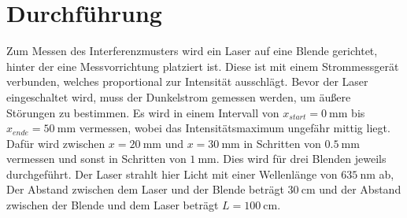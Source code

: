 \section{Durchführung}
Zum Messen des Interferenzmusters wird ein Laser auf eine Blende gerichtet, hinter der
eine Messvorrichtung platziert ist. Diese ist mit einem Strommessgerät verbunden, welches proportional zur Intensität
ausschlägt. Bevor der Laser eingeschaltet wird, muss der Dunkelstrom gemessen werden, um äußere Störungen zu bestimmen.
Es wird in einem Intervall von $x_{start}=\qty{0}{\milli\meter}$ bis $x_{ende}=\qty{50}{\milli\meter}$ vermessen, wobei das 
Intensitätsmaximum ungefähr mittig liegt. Dafür wird zwischen $x=\qty{20}{\milli\meter}$ und $x=\qty{30}{\milli\meter}$ in
Schritten von $\qty{0.5}{\milli\meter}$ vermessen und sonst in Schritten von $\qty{1}{\milli\meter}$. Dies wird für 
drei Blenden jeweils durchgeführt. Der Laser strahlt hier Licht mit einer Wellenlänge von $\qty{635}{\nano\meter}$ ab, 
Der Abstand zwischen dem Laser und der Blende beträgt $\qty{30}{\centi\meter}$ und der Abstand zwischen der Blende und dem
Laser beträgt $L=\qty{100}{\centi\meter}$.
\label{sec:Durchführung}
